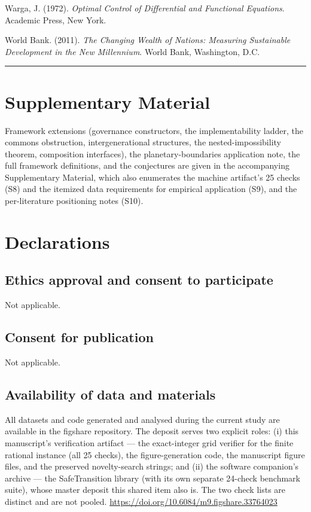 \documentclass[3p,11pt]{elsarticle}
\begin{document}
Warga, J. (1972). \emph{Optimal Control of Differential and Functional Equations}. Academic Press, New York.

World Bank. (2011). \emph{The Changing Wealth of Nations: Measuring
Sustainable Development in the New Millennium}. World Bank, Washington,
D.C.

\begin{center}\rule{0.5\linewidth}{0.5pt}\end{center}

\section*{Supplementary Material}\label{supplementary-material}

Framework extensions (governance constructors, the implementability ladder, the commons obstruction, intergenerational structures, the nested-impossibility theorem, composition interfaces), the planetary-boundaries application note, the full framework definitions, and the conjectures are given in the accompanying Supplementary Material, which also enumerates the machine artifact's 25 checks (S8) and the itemized data requirements for empirical application (S9), and the per-literature positioning notes (S10).

\section*{Declarations}\label{declarations}

\subsection*{Ethics approval and consent to participate}

Not applicable.

\subsection*{Consent for publication}

Not applicable.

\subsection*{Availability of data and materials}

All datasets and code generated and analysed during the current study are available in the figshare repository. The deposit serves two explicit roles: (i) this manuscript's verification artifact --- the exact-integer grid verifier for the finite rational instance (all 25 checks), the figure-generation code, the manuscript figure files, and the preserved novelty-search strings; and (ii) the software companion's archive --- the SafeTransition library (with its own separate 24-check benchmark suite), whose master deposit this shared item also is. The two check lists are distinct and are not pooled. \url{https://doi.org/10.6084/m9.figshare.33764023}
\end{document}
